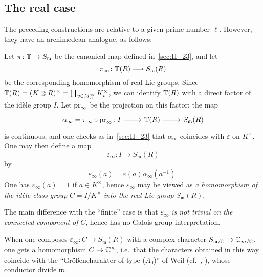 \subsection{The real case}
The preceding constructions are relative to a given prime number $\ell$.
However, they have an archimedean analogue, as follows: 

Let $\pi \colon \mathbb{T} \to S_\mathfrak{m}$ be the canonical map defined 
in~\ref{sec:II_23}, and let 
\[
	\pi_{\infty} \colon \mathbb{T}(R) \longrightarrow S_\mathfrak{m}(R)
\]
be the corresponding homomorphism of real Lie groups. Since $\mathbb{T}(R) = (K
\otimes R)^{\times} = \prod_{v \in M_K^\infty} K_v^{\times}$, we can identify
$\mathbb{T}(R)$ with a direct factor of the idèle group $I$. Let $\operatorname{pr}_\infty$ be the
projection on this factor; the map 
\dpage
\[\begin{tikzcd}
	\alpha_\infty = \pi_\infty \circ \pr_\infty \colon I \arrow[r] & \TT(R) 
	\arrow[r] & S_\mathfrak{m}(R)
\end{tikzcd}\]
is continuous, and one checks as in~\ref{sec:II_23} that $\alpha_\infty$ 
coincides with $\varepsilon$ on $K^{\times}$. One may then define a map
\[
	\varepsilon_{\infty} \colon I \longrightarrow S_{\mathfrak{m}}(R)
\]
by 
\[
	\varepsilon_\infty(a) = \varepsilon(a)\alpha_\infty(a^{-1}).
\]
One has $\varepsilon_\infty(a) = 1$ if $a \in K^{\times}$, hence 
$\varepsilon_\infty$ may be viewed as \emph{a homomorphism of the idèle 
class group} $C = I/K^{\times}$ \emph{into the real Lie group} $S_\mathfrak{m}
(R)$.

The main difference with the ``finite'' case is that $\varepsilon_\infty$ 
\emph{is not trivial on the connected component of} $C$, hence has no Galois 
group interpretation.

When one composes $\varepsilon_\infty \colon C \to S_\mathfrak{m}(R)$ with a 
complex character $S_{\mathfrak{m}/\mathbb{C}} \to \mathbb{G}_{m/\mathbb{C}}$, one gets a 
homomorphism $C \to \mathbb{C}^{\times}$, i.e.\ that the characters obtained in this
way coincide with the ``Gr\"o\ss encharakter of type ($A_0$)'' of Weil (cf.\ 
\cite{35}, \cite{41}), whose conductor divide $\mathfrak{m}$.

